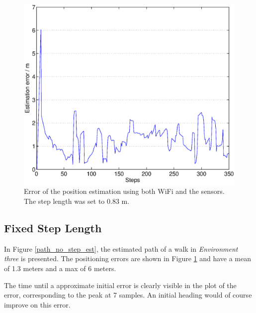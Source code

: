 \documentclass{LTHthesis}
\begin{document}
%
\begin{figure}[!hbt]

\includegraphics[width=1\textwidth ]{images/sensor_fused/error_no_step_est}
\caption{Error of the position estimation using both WiFi and the sensors. The step length was set to 0.83 m.}\label{error_no_step_est}
\end{figure}
%

%
\subsection{Fixed Step Length}
In Figure \ref{path_no_step_est}, the estimated path of a walk in \emph{Environment three} is presented. The positioning errors are shown in Figure \ref{error_no_step_est} and have a mean of 1.3 meters and a max of 6 meters. 
%

The time until a approximate initial error is clearly visible in the plot of the error, corresponding to the peak at 7 samples. An initial heading would of course improve on this error. 
\end{document}
